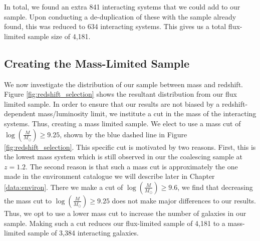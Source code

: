 In total, we found an extra 841 interacting systems that we could add to our sample. Upon conducting a de-duplication of these with the sample already found, this was reduced to 634 interacting systems. This gives us a total flux-limited sample size of 4,181.

\subsection{Creating the Mass-Limited Sample}
\noindent We now investigate the distribution of our sample between mass and redshift. Figure \ref{fig:redshift_selection} shows the resultant distribution from our flux limited sample. In order to ensure that our results are not biased by a redshift-dependent mass/luminosity limit, we institute a cut in the mass of the interacting systems. Thus, creating a mass limited sample. We elect to use a mass cut of $\log(\frac{M}{M_\odot}) \geq 9.25$, shown by the blue dashed line in Figure \ref{fig:redshift_selection}. This specific cut is motivated by two reasons. First, this is the lowest mass system which is still observed in our the coalescing sample at $z = 1.2$. The second reason is that such a mass cut is approximately the one made in the environment catalogue we will describe later in Chapter \ref{data:environ}. There we make a cut of $\log(\frac{M}{M_\odot}) \geq 9.6$, we find that decreasing the mass cut to $\log(\frac{M}{M_\odot}) \geq 9.25$ does not make major differences to our results. Thus, we opt to use a lower mass cut to increase the number of galaxies in our sample. Making such a cut reduces our flux-limited sample of 4,181 to a mass-limited sample of 3,384 interacting galaxies.

